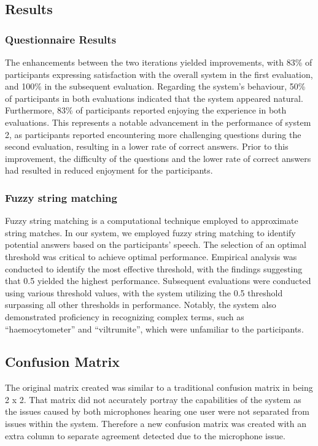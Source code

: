 \documentclass[hidelinks, 11pt]{article}
\begin{document}
\subsection{Results}
\label{subsec:results}

\subsubsection{Questionnaire Results}
The enhancements between the two iterations yielded improvements, with 83\% of participants expressing satisfaction with the overall system in the first evaluation, and 100\% in the subsequent evaluation. Regarding the system's behaviour, 50\% of participants in both evaluations indicated that the system appeared natural. Furthermore, 83\% of participants reported enjoying the experience in both evaluations. This represents a notable advancement in the performance of system 2, as participants reported encountering more challenging questions during the second evaluation, resulting in a lower rate of correct answers. Prior to this improvement, the difficulty of the questions and the lower rate of correct answers had resulted in reduced enjoyment for the participants.

\subsubsection{Fuzzy string matching}
\label{subsec:fuzzy_string}
Fuzzy string matching is a computational technique employed to approximate string matches. In our system, we employed fuzzy string matching to identify potential answers based on the participants' speech. The selection of an optimal threshold was critical to achieve optimal performance. Empirical analysis was conducted to identify the most effective threshold, with the findings suggesting that 0.5 yielded the highest performance. Subsequent evaluations were conducted using various threshold values, with the system utilizing the 0.5 threshold surpassing all other thresholds in performance. Notably, the system also demonstrated proficiency in recognizing complex terms, such as ``haemocytometer'' and ``viltrumite'', which were unfamiliar to the participants.

\subsection{Confusion Matrix}
The original matrix created was similar to a traditional confusion matrix in being 2 x 2. That matrix did not accurately portray the capabilities of the system as the issues caused by both microphones hearing one user were not separated from issues within the system. Therefore a new confusion matrix was created with an extra column to separate agreement detected due to the microphone issue.
\end{document}
